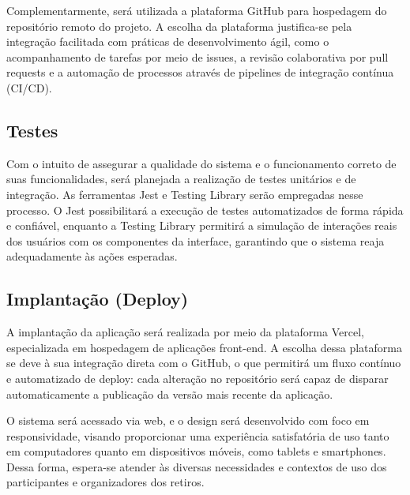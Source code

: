 Complementarmente, será utilizada a plataforma GitHub para hospedagem do repositório remoto do projeto. A escolha da plataforma justifica-se pela integração facilitada com práticas de desenvolvimento ágil, como o acompanhamento de tarefas por meio de issues, a revisão colaborativa por pull requests e a automação de processos através de pipelines de integração contínua (CI/CD).

\subsection{Testes}

Com o intuito de assegurar a qualidade do sistema e o funcionamento correto de suas funcionalidades, será planejada a realização de testes unitários e de integração. As ferramentas Jest e Testing Library serão empregadas nesse processo. O Jest possibilitará a execução de testes automatizados de forma rápida e confiável, enquanto a Testing Library permitirá a simulação de interações reais dos usuários com os componentes da interface, garantindo que o sistema reaja adequadamente às ações esperadas.

\subsection{Implantação (Deploy)}

A implantação da aplicação será realizada por meio da plataforma Vercel, especializada em hospedagem de aplicações front-end. A escolha dessa plataforma se deve à sua integração direta com o GitHub, o que permitirá um fluxo contínuo e automatizado de deploy: cada alteração no repositório será capaz de disparar automaticamente a publicação da versão mais recente da aplicação.

O sistema será acessado via web, e o design será desenvolvido com foco em responsividade, visando proporcionar uma experiência satisfatória de uso tanto em computadores quanto em dispositivos móveis, como tablets e smartphones. Dessa forma, espera-se atender às diversas necessidades e contextos de uso dos participantes e organizadores dos retiros.